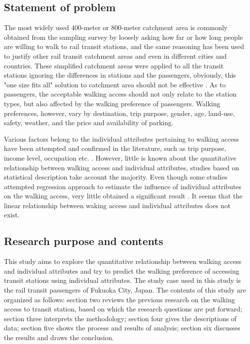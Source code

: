 \subsection{Statement of problem}
The most widely used 400-meter or 800-meter catchment area is commonly obtained from the sampling survey by loosely asking how far or how long people are willing to walk to rail transit stations, and the same reasoning has been used to justify other rail transit catchment areas and even in different cities and countries. These simplified catchment areas were applied to all the transit stations ignoring the differences in stations and the passengers, obviously, this "one size fits all" solution to catchment area should not be effective \cite{zhao2003forecasting,chia2016walking}. As to passengers, the acceptable walking access should not only relate to the station types, but also affected by the walking preference of passengers. Walking preferences, however, vary by destination, trip purpose, gender, age, land-use, safety, weather, and the price and availability of parking. 

Various factors belong to the individual attributes pertaining to walking access have been attempted and confirmed in the literature, such as trip purpose, income level, occupation etc. \cite{alshalalfah2007case, weinstein2008far,chia2016walking}. However, little is known about the quantitative relationship between walking access and individual attributes, studies based on statistical description take account the majority. Even though some studies attempted regression approach to estimate the influence of individual attributes on the walking access, very little obtained a significant result \cite{jiang2012walk,daniels2013explaining}. It seems that the linear relationship between waking access and individual attributes does not exist.

\subsection{Research purpose and contents}
This study aims to explore the quantitative relationship between walking access and individual attributes and try to predict the walking preference of accessing transit stations using individual attributes. The study case used in this study is the rail transit passengers of Fukuoka City, Japan. The contents of this study are organized as follows: section two reviews the previous research on the walking access to transit station, based on which the research questions are put forward; section three interprets the methodology; section four gives the descriptions of data; section five shows the process and results of analysis; section six discusses the results and draws the conclusion. 

